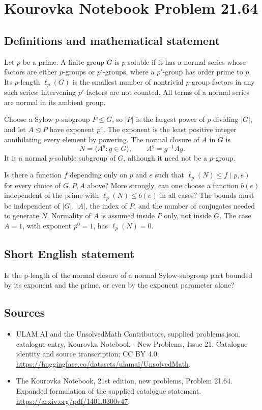 \documentclass[11pt,a4paper]{article}
\begin{document}
\section*{Kourovka Notebook Problem 21.64}\label{statement}

\subsection{Definitions and mathematical statement}
Let $p$ be a prime. A finite group $G$ is $p$-soluble if it has a
normal series whose factors are either $p$-groups or $p'$-groups,
where a $p'$-group has order prime to $p$. Its $p$-length
$\ell_p(G)$ is the smallest number of nontrivial $p$-group factors
in any such series; intervening $p'$-factors are not counted.
All terms of a normal series are normal in its ambient group.

Choose a Sylow $p$-subgroup $P\le G$, so $|P|$ is the largest power
of $p$ dividing $|G|$, and let $A\trianglelefteq P$ have exponent
$p^e$. The exponent is the least positive integer annihilating every
element by powering. The normal closure of $A$ in $G$ is
\[
 N=\langle A^g:g\in G\rangle,
 \qquad A^g=g^{-1}Ag.
\]
It is a normal $p$-soluble subgroup of $G$, although it need not be
a $p$-group.

Is there a function $f$ depending only on $p$ and $e$ such that
$\ell_p(N)\le f(p,e)$ for every choice of $G,P,A$ above? More
strongly, can one choose a function $b(e)$ independent of the prime
with $\ell_p(N)\le b(e)$ in all cases?
The bounds must be independent of $|G|$, $|A|$, the index of $P$,
and the number of conjugates needed to generate $N$. Normality of $A$
is assumed inside $P$ only, not inside $G$. The case $A=1$, with
exponent $p^0=1$, has $\ell_p(N)=0$.
\subsection{Short English statement}
Is the p-length of the normal closure of a normal Sylow-subgroup part bounded by its exponent and the prime, or even by the exponent parameter alone?
\subsection{Sources}
\begin{itemize}
\item[S1] ULAM.AI and the UnsolvedMath Contributors, supplied problems.json, catalogue entry, Kourovka Notebook - New Problems, Issue 21. Catalogue identity and source transcription; CC BY 4.0.
\url{https://huggingface.co/datasets/ulamai/UnsolvedMath}.
\item[S2] The Kourovka Notebook, 21st edition, new problems, Problem 21.64. Expanded formulation of the supplied catalogue statement.
\url{https://arxiv.org/pdf/1401.0300v47}.
\end{itemize}
\end{document}
